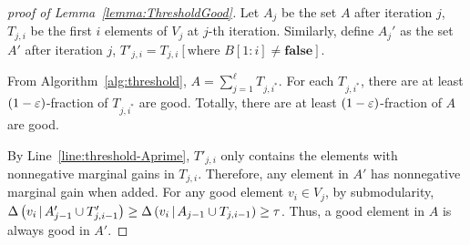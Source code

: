 

\ThresholdGood*
\begin{proof}[proof of Lemma~\ref{lemma:ThresholdGood}]
    Let $A_j$ be the set $A$ after iteration $j$,
    $T_{j,i}$ be the first $i$ elements of $V_j$ at $j$-th iteration.
    Similarly, define $A_j'$ as the set $A'$ after iteration $j$,
    $T'_{j,i}= T_{j,i}[\text{where }B[1:i] \not = \textbf{false}]$.

    From Algorithm~\ref{alg:threshold}, $A=\sum_{j=1}^{\ell} T_{j,i^*}$.
    For each $T_{j,i^*}$, there are at least $(1-\varepsilon)$-fraction of $T_{j,i^*}$ are good.
    Totally, there are at least $(1-\varepsilon)$-fraction of $A$ are good.

    By Line~\ref{line:threshold-Aprime}, $T'_{j,i}$ only contains the elements
    with nonnegative marginal gains in $T_{j,i}$.
    Therefore, any element in $A'$ has nonnegative marginal gain when added.
    For any good element $v_i \in V_j$, by submodularity, 
    $\Delta \left( v_i \, | \, A'_{j-1}\cup T'_{j,i-1} \right)\ge 
    \Delta \left( v_i \, | \, A_{j-1}\cup T_{j,i-1} \right) \ge \tau$.
    Thus, a good element in $A$ is always good in $A'$.
\end{proof}

